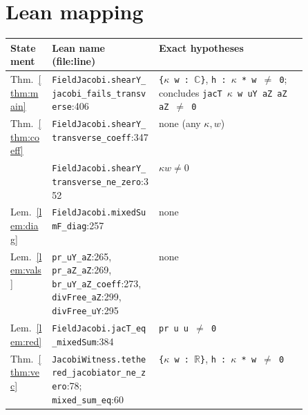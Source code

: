 \documentclass[11pt]{article}\emergencystretch=2em
\theoremstyle{definition}\newtheorem{definition}[theorem]{Definition}\theoremstyle{remark}\newtheorem{remark}[theorem]{Remark}
\begin{document}
\section{Lean mapping}
\small\let\oldus\_\renewcommand\_{\oldus\allowbreak}\begin{tabularx}{\linewidth}{@{}>{\raggedright}p{0.14\linewidth}>{\raggedright}p{0.36\linewidth}>{\raggedright\arraybackslash}X@{}}\toprule
Statement & Lean name (file:line) & Exact hypotheses\\\midrule
Thm.~\ref{thm:main} & \texttt{FieldJacobi.shearY\_jacobi\_fails\_transverse}:406 & \texttt{\{$\kappa$ w : $\mathbb{C}$\}}, \texttt{h : $\kappa$ * w $\ne$ 0}; concludes \texttt{jacT $\kappa$ w uY aZ aZ aZ $\ne$ 0}\\
Thm.~\ref{thm:coeff} & \texttt{FieldJacobi.shearY\_transverse\_coeff}:347 & none (any $\kappa,w$)\\
& \texttt{FieldJacobi.shearY\_transverse\_ne\_zero}:352 & $\kappa w\ne0$\\
Lem.~\ref{lem:diag} & \texttt{FieldJacobi.mixedSumF\_diag}:257 & none\\
Lem.~\ref{lem:vals} & \texttt{pr\_uY\_aZ}:265, \texttt{pr\_aZ\_aZ}:269, \texttt{br\_uY\_aZ\_coeff}:273, \texttt{divFree\_aZ}:299, \texttt{divFree\_uY}:295 & none\\
Lem.~\ref{lem:red} & \texttt{FieldJacobi.jacT\_eq\_mixedSum}:384 & \texttt{pr u u $\ne$ 0}\\
Thm.~\ref{thm:vec} & \texttt{JacobiWitness.tethered\_jacobiator\_ne\_zero}:78; \texttt{mixed\_sum\_eq}:60 & \texttt{\{$\kappa$ w : $\mathbb{R}$\}}, \texttt{h : $\kappa$ * w $\ne$ 0}\\
\bottomrule\end{tabularx}\normalsize
\end{document}
